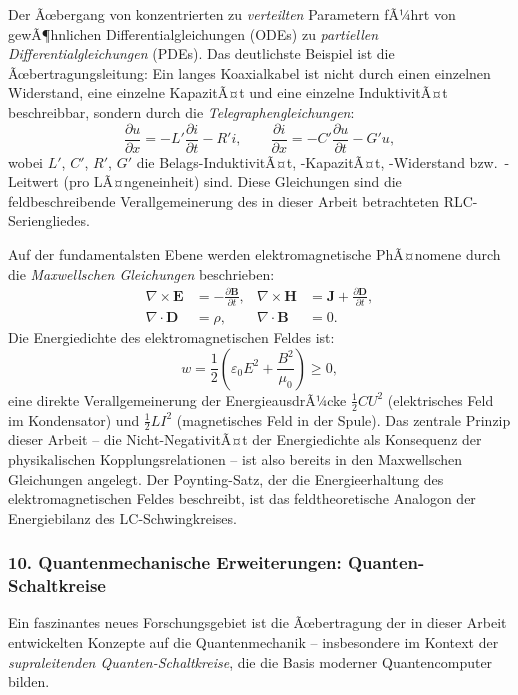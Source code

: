 ﻿\documentclass[12pt, a4paper]{article}
\begin{document}
	Der Ãœbergang von konzentrierten zu \textit{verteilten} Parametern fÃ¼hrt von gewÃ¶hnlichen Differentialgleichungen (ODEs) zu \textit{partiellen Differentialgleichungen} (PDEs). Das deutlichste Beispiel ist die Ãœbertragungsleitung: Ein langes Koaxialkabel ist nicht durch einen einzelnen Widerstand, eine einzelne KapazitÃ¤t und eine einzelne InduktivitÃ¤t beschreibbar, sondern durch die \textit{Telegraphengleichungen}:
	\begin{equation}
		\frac{\partial u}{\partial x} = -L'\frac{\partial i}{\partial t} - R'i, \qquad \frac{\partial i}{\partial x} = -C'\frac{\partial u}{\partial t} - G'u,
	\end{equation}
	wobei $L'$, $C'$, $R'$, $G'$ die Belags-InduktivitÃ¤t, -KapazitÃ¤t, -Widerstand bzw.\ -Leitwert (pro LÃ¤ngeneinheit) sind. Diese Gleichungen sind die feldbeschreibende Verallgemeinerung des in dieser Arbeit betrachteten RLC-Seriengliedes.

	Auf der fundamentalsten Ebene werden elektromagnetische PhÃ¤nomene durch die \textit{Maxwellschen Gleichungen} beschrieben:
	\begin{align}
		\nabla \times \mathbf{E} &= -\frac{\partial \mathbf{B}}{\partial t}, &
		\nabla \times \mathbf{H} &= \mathbf{J} + \frac{\partial \mathbf{D}}{\partial t}, \\
		\nabla \cdot \mathbf{D} &= \rho, &
		\nabla \cdot \mathbf{B} &= 0.
	\end{align}
	Die Energiedichte des elektromagnetischen Feldes ist:
	\begin{equation}
		w = \frac{1}{2}\left(\varepsilon_0 E^2 + \frac{B^2}{\mu_0}\right) \geq 0,
	\end{equation}
	eine direkte Verallgemeinerung der EnergieausdrÃ¼cke $\frac{1}{2}CU^2$ (elektrisches Feld im Kondensator) und $\frac{1}{2}LI^2$ (magnetisches Feld in der Spule). Das zentrale Prinzip dieser Arbeit -- die Nicht-NegativitÃ¤t der Energiedichte als Konsequenz der physikalischen Kopplungsrelationen -- ist also bereits in den Maxwellschen Gleichungen angelegt. Der Poynting-Satz, der die Energieerhaltung des elektromagnetischen Feldes beschreibt, ist das feldtheoretische Analogon der Energiebilanz des LC-Schwingkreises.

	\subsubsection*{10. \quad Quantenmechanische Erweiterungen: Quanten-Schaltkreise}

	Ein faszinantes neues Forschungsgebiet ist die Ãœbertragung der in dieser Arbeit entwickelten Konzepte auf die Quantenmechanik -- insbesondere im Kontext der \textit{supraleitenden Quanten-Schaltkreise}, die die Basis moderner Quantencomputer bilden.
\end{document}
